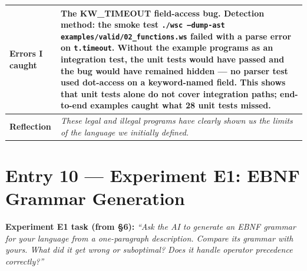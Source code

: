 \documentclass[a4paper,10pt]{article}
\begin{document}
\begin{tabular}{|
    >{\bfseries}m{3.5cm}|
    m{10cm}|
}
\hline
\rowcolor{altrow}
Errors I caught   & The KW\_TIMEOUT field-access bug. Detection method: the smoke test \texttt{./wsc --dump-ast examples/valid/02\_functions.ws} failed with a parse error on \texttt{t.timeout}. Without the example programs as an integration test, the unit tests would have passed and the bug would have remained hidden --- no parser test used dot-access on a keyword-named field. This shows that unit tests alone do not cover integration paths; end-to-end examples caught what 28 unit tests missed. \\
\hline
\rowcolor{white}
Reflection & \textit{These legal and illegal programs have clearly shown us the limits of the language we initially defined.} \\
\hline
\end{tabular}

\newpage


\section{Entry 10 --- Experiment E1: EBNF Grammar Generation}
\label{exp:e1}

\textbf{Experiment E1 task (from §6):} \textit{``Ask the AI to generate an
EBNF grammar for your language from a one-paragraph description. Compare its
grammar with yours. What did it get wrong or suboptimal? Does it handle
operator precedence correctly?''}

\medskip
\end{document}

